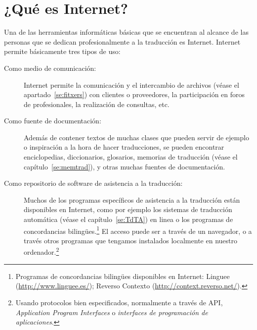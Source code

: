 \chapter{¿Qué es Internet?} \label{se:Internet}  

Una de las herramientas informáticas básicas que se encuentran al alcance de las personas que se dedican profesionalmente a la traducción es Internet. Internet permite básicamente tres tipos de uso: \begin{description} \item[Como medio de comunicación:] Internet permite la comunicación y el intercambio de archivos (véase el apartado~\ref{se:fitxers}) con clientes o proveedores, la participación en foros de profesionales, la realización de consultas, etc. \item[Como fuente de documentación:] Además de contener textos de muchas clases que pueden servir de ejemplo o inspiración a la hora de hacer traducciones, se pueden encontrar enciclopedias, diccionarios, glosarios, memorias de traducción (véase el capítulo~\ref{se:memtrad}), y otras muchas fuentes de documentación. \item[Como repositorio de software de asistencia a la traducción:] Muchos de los programas específicos de asistencia a la traducción están disponibles en Internet, como por ejemplo los sistemas de traducción automática (véase el capítulo~\ref{se:TdTA}) en linea o los programas de concordancias bilingües.\footnote{Programas de concordancias bilingües disponibles en Internet: Linguee (\url{http://www.linguee.es/}); Reverso Contexto (\url{http://context.reverso.net/}).} El acceso puede ser a través de un navegador, o a través otros programas que tengamos instalados localmente en nuestro ordenador.\footnote{Usando protocolos bien especificados, normalmente a través de API, \emph{Application Program Interfaces} o \emph{interfaces de programación de aplicaciones}.} \end{description} 


